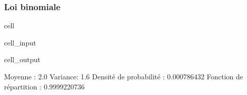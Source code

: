 \documentclass[letterpaper,10pt,english]{jupyterBook}
\begin{document}
\subsubsection{Loi binomiale}
\label{\detokenize{elemstats:loi-binomiale}}
\begin{sphinxuseclass}{cell}\begin{sphinxVerbatimInput}

\begin{sphinxuseclass}{cell_input}
\begin{sphinxVerbatim}[commandchars=\\\{\}]
   

   
   
   

  
  
   
 
\end{sphinxVerbatim}

\end{sphinxuseclass}\end{sphinxVerbatimInput}
\begin{sphinxVerbatimOutput}

\begin{sphinxuseclass}{cell_output}
\begin{sphinxVerbatim}[commandchars=\\\{\}]
Moyenne :  2.0
Variance:  1.6
Densité de probabilité :  0.000786432
Fonction de répartition :  0.9999220736
\end{sphinxVerbatim}

\end{sphinxuseclass}\end{sphinxVerbatimOutput}

\end{sphinxuseclass}
\end{document}
